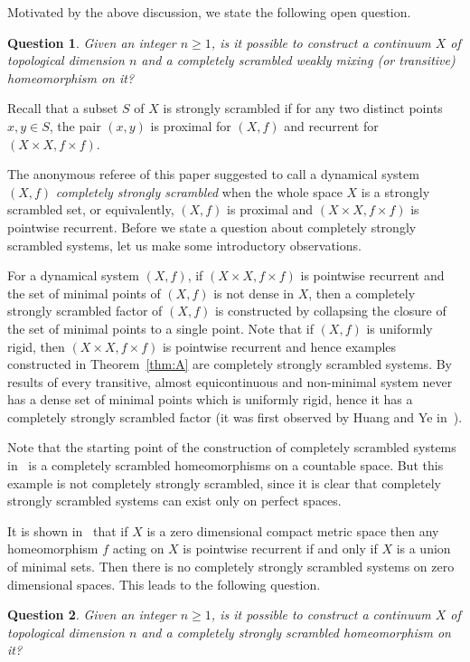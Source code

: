 \documentclass[reqno,a4paper,12pt]{amsart}
\newtheorem{que}{Question}
\theoremstyle{definition}
\numberwithin{equation}{section}
\begin{document}
Motivated by the above discussion, we state the following open question.
\begin{que}\label{que1}
Given an integer $n\geq 1$, is it possible to construct a continuum $X$ of topological dimension $n$ and a completely scrambled
weakly mixing (or transitive) homeomorphism on it?
\end{que}

Recall that  a subset $S$ of $X$  is strongly scrambled if
for any two distinct points $x,y\in S$, the pair $(x,y)$ is proximal for $(X,f)$ and recurrent for $(X\times X, f\times f)$.

The anonymous referee of this paper suggested to call a dynamical system $(X,f)$ \emph{completely strongly scrambled} when
the whole space $X$ is a strongly scrambled set, or equivalently,
$(X,f)$ is proximal and $(X\times X, f\times f)$ is pointwise recurrent. Before we state a question about completely strongly scrambled
systems, let us make some introductory observations.

For a dynamical system $(X,f)$,
if $(X\times X, f\times f)$ is pointwise recurrent and the set of minimal points of $(X,f)$ is not dense in $X$,
then a completely strongly scrambled factor of $(X,f)$ is constructed by collapsing the closure of the set of
minimal points to a single point.
Note that if $(X,f)$ is uniformly rigid, then $(X\times X, f\times f)$ is pointwise recurrent and hence
examples constructed in Theorem~\ref{thm:A} are completely strongly scrambled systems.
By results of \cite{AAB} every transitive, almost equicontinuous and non-minimal system never
has a dense set of minimal points which is
uniformly rigid,
hence it has a completely strongly scrambled factor
(it was first observed by Huang and Ye in~\cite{HY02}).

Note that the starting point of the construction of completely scrambled systems
in~\cite{HYCS} is a completely scrambled homeomorphisms on a countable space.
But this example is not completely strongly scrambled, since it is clear that
completely strongly scrambled systems can exist only on perfect spaces.

It is shown in~\cite{AGW05} that if $X$ is a zero dimensional compact metric space
then any homeomorphism $f$ acting on $X$ is pointwise recurrent if and only if
$X$ is a union of minimal sets.
Then there is no completely strongly scrambled systems on zero dimensional spaces.
This leads to the following question.

\begin{que}
Given an integer $n\geq 1$, is it possible to construct a continuum $X$ of topological dimension $n$
and a completely strongly scrambled homeomorphism on it?
\end{que}
\end{document}
